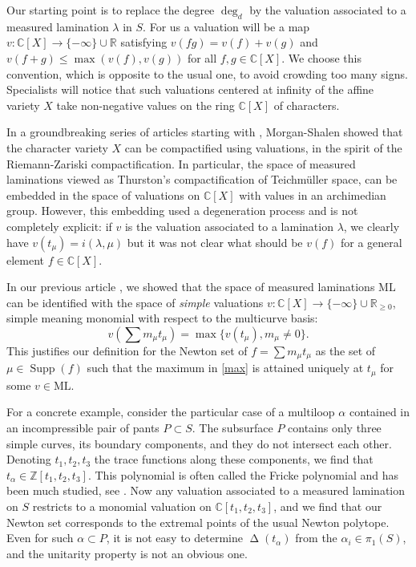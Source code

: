 \documentclass{amsart}
\newcommand{\C}{\mathbb{C}}
\newcommand{\R}{\mathbb{R}}
\newcommand{\Z}{\mathbb{Z}}
\newcommand{\ML}{\mathrm{ML}}
\DeclareMathOperator{\NewSet}{\Delta}
\DeclareMathOperator{\Supp}{Supp}
\begin{document}
Our starting point is to replace the degree $\deg_d$ by the valuation associated to a measured lamination $\lambda$ in $S$.
%
For us a valuation will be a map $v:\C[X]\to \{-\infty\}\cup \R$ satisfying $v(fg)=v(f)+v(g)$ and $v(f+g)\le \max(v(f),v(g))$ for all $f,g\in \C[X]$.
%
We choose this convention, which is opposite to the usual one, to avoid crowding too many signs.  
%
Specialists will notice that such valuations centered at infinity of the affine variety $X$ take non-negative values on the ring $\C[X]$ of characters.

In a groundbreaking series of articles starting with \cite{Morgan-Shalen-I_1984}, Morgan-Shalen showed that the character variety $X$ can be compactified using valuations, in the spirit of the Riemann-Zariski compactification. In particular, the space of measured laminations viewed as Thurston's compactification of Teichmüller space, can be embedded in the space of valuations on $\C[X]$ with values in an archimedian group.
%
However, this embedding used a degeneration process and is not completely explicit: if $v$ is the valuation associated to a lamination $\lambda$, we clearly have $v(t_\mu)=i(\lambda,\mu)$ but it was not clear what should be $v(f)$ for a general element $f\in \C[X]$. 

In our previous article \cite{MS_Aut(CV)_2020}, we showed that the space of measured laminations $\ML$ can be identified with the space of \emph{simple} valuations $v:\C[X]\to \{-\infty\}\cup \R_{\ge 0}$, simple meaning monomial with respect to the multicurve basis:
%
\begin{equation}\label{max}
v\left(\sum m_\mu t_\mu\right)=\max\{v(t_\mu), m_\mu\ne 0\}.
\end{equation}
%
This justifies our definition for the Newton set of $f=\sum m_\mu t_\mu$ as the set of $\mu\in \Supp(f)$ such that the maximum in \eqref{max} is attained uniquely at $t_\mu$ for some $v\in \ML$.

For a concrete example, consider the particular case of a multiloop $\alpha$ contained in an incompressible pair of pants $P\subset S$. The subsurface $P$ contains only three simple curves, its boundary components, and they do not intersect each other. Denoting $t_1,t_2,t_3$ the trace functions along these components, we find that $t_\alpha\in \Z[t_1,t_2,t_3]$. This polynomial is often called the Fricke polynomial and has been much studied, see \cite[Section 2.2]{Magnus}. 
Now any valuation associated to a measured lamination on $S$ restricts to a monomial valuation on $\C[t_1,t_2,t_3]$, and we find that our Newton set corresponds to the extremal points of the usual Newton polytope. Even for such $\alpha \subset P$, it is not easy to determine $\NewSet(t_\alpha)$ from the $\alpha_i \in \pi_1(S)$, and the unitarity property is not an obvious one.
\end{document}
